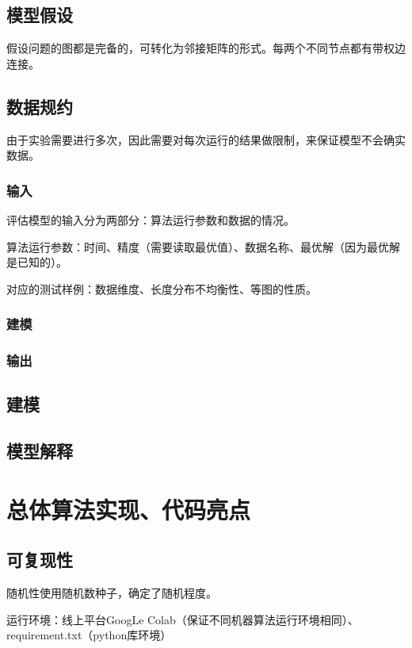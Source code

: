 \documentclass[lang=cn,11pt]{elegantpaper}
\begin{document}
\subsection{模型假设}
假设问题的图都是完备的，可转化为邻接矩阵的形式。每两个不同节点都有带权边连接。
\subsection{数据规约}
由于实验需要进行多次，因此需要对每次运行的结果做限制，来保证模型不会确实数据。
\subsubsection{输入}
评估模型的输入分为两部分：算法运行参数和数据的情况。

算法运行参数：时间、精度（需要读取最优值）、数据名称、最优解（因为最优解是已知的）。

对应的测试样例：数据维度、长度分布不均衡性、等图的性质。


\subsubsection{建模}
\subsubsection{输出}
\subsection{建模}
\subsection{模型解释}

\section{总体算法实现、代码亮点}
\subsection{可复现性}
随机性使用随机数种子，确定了随机程度。

运行环境：线上平台GoogLe Colab（保证不同机器算法运行环境相同）、requirement.txt（python库环境）
\end{document}
